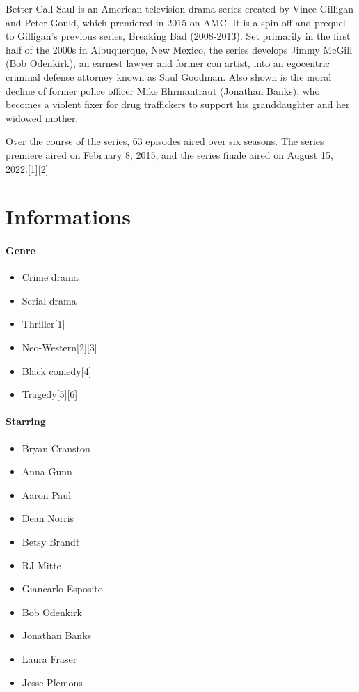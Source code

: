 \documentclass[
  letterpaper,
  DIV=11,
  numbers=noendperiod]{scrartcl}
\let\oldparagraph\paragraph
\renewcommand{\paragraph}[1]{\oldparagraph{#1}\mbox{}}
\providecommand{\tightlist}{%
  \setlength{\itemsep}{0pt}\setlength{\parskip}{0pt}}\usepackage{longtable,booktabs,array}
\begin{document}
Better Call Saul is an American television drama series created by Vince
Gilligan and Peter Gould, which premiered in 2015 on AMC. It is a
spin-off and prequel to Gilligan's previous series, Breaking Bad
(2008-2013). Set primarily in the first half of the 2000s in
Albuquerque, New Mexico, the series develops Jimmy McGill (Bob
Odenkirk), an earnest lawyer and former con artist, into an egocentric
criminal defense attorney known as Saul Goodman. Also shown is the moral
decline of former police officer Mike Ehrmantraut (Jonathan Banks), who
becomes a violent fixer for drug traffickers to support his
granddaughter and her widowed mother.

Over the course of the series, 63 episodes aired over six seasons. The
series premiere aired on February 8, 2015, and the series finale aired
on August 15, 2022.{[}1{]}{[}2{]}

\hypertarget{informations}{%
\section{Informations}\label{informations}}

\hypertarget{genre}{%
\paragraph{Genre}\label{genre}}

\begin{itemize}
\tightlist
\item
  Crime drama
\item
  Serial drama
\item
  Thriller{[}1{]}
\item
  Neo-Western{[}2{]}{[}3{]}
\item
  Black comedy{[}4{]}
\item
  Tragedy{[}5{]}{[}6{]}
\end{itemize}

\hypertarget{starring}{%
\paragraph{Starring}\label{starring}}

\begin{itemize}
\tightlist
\item
  Bryan Cranston
\item
  Anna Gunn
\item
  Aaron Paul
\item
  Dean Norris
\item
  Betsy Brandt
\item
  RJ Mitte
\item
  Giancarlo Esposito
\item
  Bob Odenkirk
\item
  Jonathan Banks
\item
  Laura Fraser
\item
  Jesse Plemons
\end{itemize}
\end{document}
